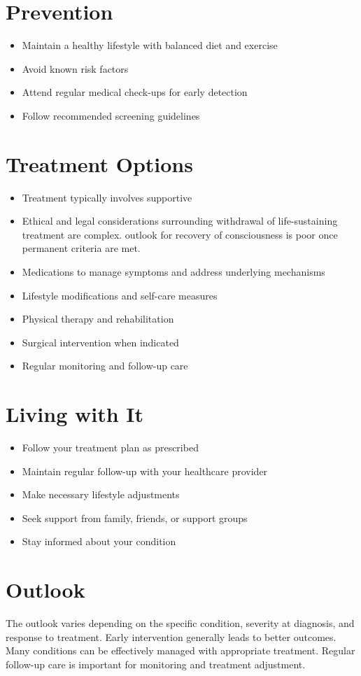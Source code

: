 \section{Prevention}
\begin{itemize}[noitemsep]
  \item Maintain a healthy lifestyle with balanced diet and exercise
  \item Avoid known risk factors
  \item Attend regular medical check-ups for early detection
  \item Follow recommended screening guidelines
\end{itemize}
\section{Treatment Options}
\begin{itemize}[noitemsep]
  \item Treatment typically involves supportive
  \item Ethical and legal considerations surrounding withdrawal of life-sustaining treatment are complex. outlook for recovery of consciousness is poor once permanent criteria are met.
  \item Medications to manage symptoms and address underlying mechanisms
  \item Lifestyle modifications and self-care measures
  \item Physical therapy and rehabilitation
  \item Surgical intervention when indicated
  \item Regular monitoring and follow-up care
\end{itemize}
\section{Living with It}
\begin{itemize}[noitemsep]
  \item Follow your treatment plan as prescribed
  \item Maintain regular follow-up with your healthcare provider
  \item Make necessary lifestyle adjustments
  \item Seek support from family, friends, or support groups
  \item Stay informed about your condition
\end{itemize}
\section{Outlook}
The outlook varies depending on the specific condition, severity at diagnosis, and response to treatment. Early intervention generally leads to better outcomes. Many conditions can be effectively managed with appropriate treatment. Regular follow-up care is important for monitoring and treatment adjustment.
